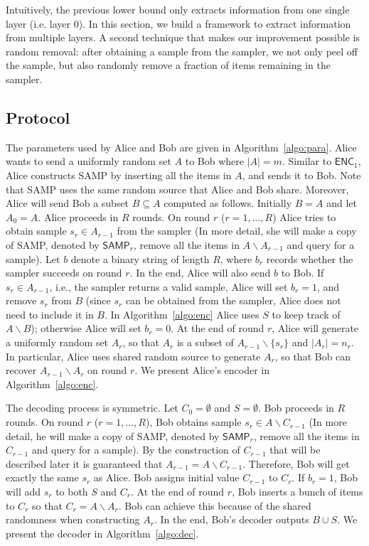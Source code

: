 \documentclass[10pt]{article}
\newcommand{\samp}{\textsf{SAMP}\xspace}
\newcommand{\enc}{\textsf{ENC}\xspace}
\begin{document}
Intuitively, the previous lower bound only extracts information from one single layer (i.e. layer $0$). In this section, we build a framework to extract information from multiple layers. A second technique that makes our improvement possible is random removal: after obtaining a sample from the sampler, we not only peel off the sample, but also randomly remove a fraction of items remaining in the sampler. 

\subsection{Protocol}

The parameters used by Alice and Bob are given in Algorithm~\ref{algo:para}.
Alice wants to send a uniformly random set $A$ to Bob where $|A|=m$. Similar to $\enc_1$, Alice constructs \samp by inserting all the items in $A$, and sends it to Bob. Note that \samp uses the same random source that Alice and Bob share. Moreover, Alice will send Bob a subset $B\subseteq A$ computed as follows. Initially $B=A$ and let $A_0=A$. Alice proceeds in $R$ rounds. On round $r$ ($r=1,\ldots, R$) Alice tries to obtain sample $s_r\in A_{r-1}$ from the sampler 
(In more detail, she will make a copy of \samp, denoted by $\samp_r$, remove all the items in $A\backslash A_{r-1}$ and query for a sample). 
Let $b$ denote a binary string of length $R$, where $b_r$ records whether the sampler succeeds on round $r$. In the end, Alice will also send $b$ to Bob. If $s_r\in A_{r-1}$, i.e., the sampler returns a valid sample, Alice will set $b_r=1$, and remove $s_r$ from $B$ (since $s_r$ can be obtained from the sampler, Alice does not need to include it in $B$. In Algorithm~\ref{algo:enc} Alice uses $S$ to keep track of $A\backslash B$); otherwise Alice will set $b_r=0$.
At the end of round $r$, Alice will generate a uniformly random set $A_r$, so that $A_r$ is a subset of $A_{r-1}\backslash \{s_r\}$ and $|A_r|=n_r$. 
In particular, Alice uses shared random source to generate $A_r$, so that Bob can recover $A_{r-1}\backslash A_r$ on round $r$. 
We present Alice's encoder in Algorithm~\ref{algo:enc}.

The decoding process is symmetric. Let $C_0=\emptyset$ and $S=\emptyset$. Bob proceeds in $R$ rounds. 
On round $r$ ($r=1,\ldots,R$), Bob obtains sample $s_r\in A\backslash C_{r-1}$ (In more detail, he will make a copy of \samp, denoted by $\samp_r$, remove all the items in $C_{r-1}$ and query for a sample). 
By the construction of $C_{r-1}$ that will be described later it is guaranteed that $A_{r-1}=A\backslash C_{r-1}$. 
Therefore, Bob will get exactly the same $s_r$ as Alice. 
Bob assigns initial value $C_{r-1}$ to $C_r$.
If $b_r=1$, Bob will add $s_r$ to both $S$ and $C_r$.
At the end of round $r$, Bob inserts a bunch of items to $C_r$ so that $C_r=A\backslash A_r$. Bob can achieve this because of the shared randomness when constructing $A_r$.
In the end, Bob's decoder outputs $B\cup S$.
We present the decoder in Algorithm~\ref{algo:dec}.
\end{document}

